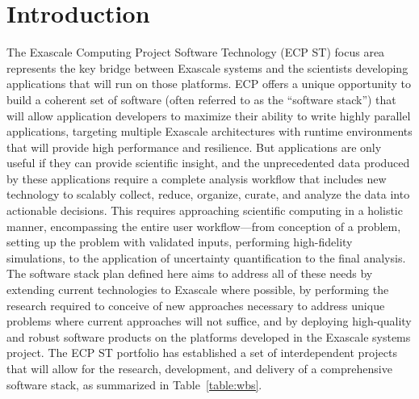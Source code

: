 \section{Introduction}
The Exascale Computing Project Software Technology (ECP ST) focus area represents the key bridge between Exascale systems and the scientists developing applications that will run on those platforms. ECP offers a unique opportunity to build a coherent set of software (often referred to as the ``software stack'') that will allow application developers to maximize their ability to write highly parallel applications, targeting multiple Exascale architectures with runtime environments that will provide high performance and resilience. But applications are only useful if they can provide scientific insight, and the unprecedented data produced by these applications require a complete analysis workflow that includes new technology to scalably collect, reduce, organize, curate, and analyze the data into actionable decisions. This requires approaching scientific computing in a holistic manner, encompassing the entire user workflow—from conception of a problem, setting up the problem with validated inputs, performing high-fidelity simulations, to the application of uncertainty quantification to the final analysis. The software stack plan defined here aims to address all of these needs by extending current technologies to Exascale where possible, by performing the research required to conceive of new approaches necessary to address unique problems where current approaches will not suffice, and by deploying high-quality and robust software products on the platforms developed in the Exascale systems project.
The ECP ST portfolio has established a set of interdependent projects that will allow for the research, development, and delivery of a comprehensive software stack, as summarized in Table~\ref{table:wbs}.

